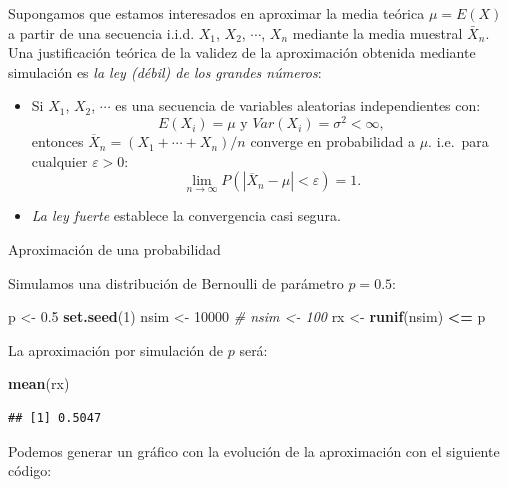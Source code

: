 \documentclass[
]{book}
\newenvironment{Shaded}{\begin{snugshade}}{\end{snugshade}}
\newcommand{\CommentTok}[1]{\textcolor[rgb]{0.56,0.35,0.01}{\textit{#1}}}
\newcommand{\DecValTok}[1]{\textcolor[rgb]{0.00,0.00,0.81}{#1}}
\newcommand{\FloatTok}[1]{\textcolor[rgb]{0.00,0.00,0.81}{#1}}
\newcommand{\KeywordTok}[1]{\textcolor[rgb]{0.13,0.29,0.53}{\textbf{#1}}}
\newcommand{\NormalTok}[1]{#1}
\newcommand{\OperatorTok}[1]{\textcolor[rgb]{0.81,0.36,0.00}{\textbf{#1}}}
\newcommand{\StringTok}[1]{\textcolor[rgb]{0.31,0.60,0.02}{#1}}
\theoremstyle{break}
\theoremstyle{definition}
\theoremstyle{definition}
\theoremstyle{definition}
\theoremstyle{remark}
\let\BeginKnitrBlock\begin \let\EndKnitrBlock\end
\begin{document}
Supongamos que estamos interesados en aproximar la media teórica
\(\mu = E\left( X\right)\) a partir de una secuencia i.i.d. \(X_{1}\),
\(X_{2}\), \(\cdots\), \(X_{n}\) mediante la media muestral \(\bar{X}_{n}\).
Una justificación teórica de la validez de la aproximación obtenida
mediante simulación es \emph{la ley (débil) de los grandes números}:

\begin{itemize}
\item
  Si \(X_{1}\), \(X_{2}\), \(\cdots\) es una secuencia de variables aleatorias
  independientes con:
  \[E\left( X_{i}\right) =\mu \text{ y }Var\left( X_{i}\right) 
  =\sigma^{2}<\infty,\]
  entonces \(\overline{X}_{n}=\left( X_{1}+\cdots +X_{n}\right) /n\)
  converge en probabilidad a \(\mu\). i.e.~para cualquier \(\varepsilon >0\):
  \[\lim\limits_{n\rightarrow \infty }P\left( \left\vert \overline{X}_{n}-\mu
  \right\vert <\varepsilon \right) = 1.\]
\item
  \emph{La ley fuerte} establece la convergencia casi segura.
\end{itemize}

\BeginKnitrBlock{example}
\protect\hypertarget{exm:unnamed-chunk-2}{}{\label{exm:unnamed-chunk-2} }Aproximación de una probabilidad
\EndKnitrBlock{example}

Simulamos una distribución de Bernoulli de parámetro \(p=0.5\):

\begin{Shaded}
\begin{Highlighting}[]
\NormalTok{p <-}\StringTok{ }\FloatTok{0.5}
\KeywordTok{set.seed}\NormalTok{(}\DecValTok{1}\NormalTok{)}
\NormalTok{nsim <-}\StringTok{ }\DecValTok{10000}
\CommentTok{# nsim <- 100}
\NormalTok{rx <-}\StringTok{ }\KeywordTok{runif}\NormalTok{(nsim) }\OperatorTok{<=}\StringTok{ }\NormalTok{p}
\end{Highlighting}
\end{Shaded}

La aproximación por simulación de \(p\) será:

\begin{Shaded}
\begin{Highlighting}[]
\KeywordTok{mean}\NormalTok{(rx) }
\end{Highlighting}
\end{Shaded}

\begin{verbatim}
## [1] 0.5047
\end{verbatim}

Podemos generar un gráfico con la evolución de la aproximación con el siguiente código:
\end{document}
